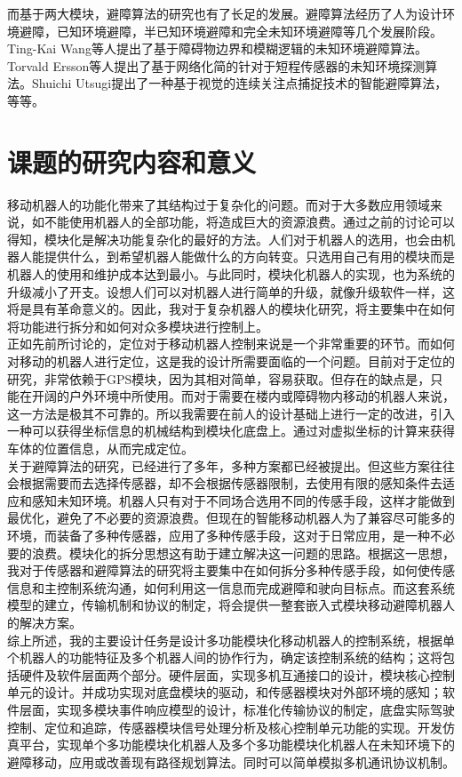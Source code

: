 而基于两大模块，避障算法的研究也有了长足的发展。避障算法经历了人为设计环境避障，已知环境避障，半已知环境避障和完全未知环境避障等几个发展阶段。Ting-Kai Wang等人提出了基于障碍物边界和模糊逻辑的未知环境避障算法。Torvald Ersson等人提出了基于网络化简的针对于短程传感器的未知环境探测算法。Shuichi Utsugi提出了一种基于视觉的连续关注点捕捉技术的智能避障算法，等等。 \\

\section{课题的研究内容和意义}
移动机器人的功能化带来了其结构过于复杂化的问题。而对于大多数应用领域来说，如不能使用机器人的全部功能，将造成巨大的资源浪费。通过之前的讨论可以得知，模块化是解决功能复杂化的最好的方法。人们对于机器人的选用，也会由机器人能提供什么，到希望机器人能做什么的方向转变。只选用自己有用的模块而是机器人的使用和维护成本达到最小。与此同时，模块化机器人的实现，也为系统的升级减小了开支。设想人们可以对机器人进行简单的升级，就像升级软件一样，这将是具有革命意义的。因此，我对于复杂机器人的模块化研究，将主要集中在如何将功能进行拆分和如何对众多模块进行控制上。 \\

正如先前所讨论的，定位对于移动机器人控制来说是一个非常重要的环节。而如何对移动的机器人进行定位，这是我的设计所需要面临的一个问题。目前对于定位的研究，非常依赖于GPS模块，因为其相对简单，容易获取。但存在的缺点是，只能在开阔的户外环境中所使用。而对于需要在楼内或障碍物内移动的机器人来说，这一方法是极其不可靠的。所以我需要在前人的设计基础上进行一定的改进，引入一种可以获得坐标信息的机械结构到模块化底盘上。通过对虚拟坐标的计算来获得车体的位置信息，从而完成定位。 \\

关于避障算法的研究，已经进行了多年，多种方案都已经被提出。但这些方案往往会根据需要而去选择传感器，却不会根据传感器限制，去使用有限的感知条件去适应和感知未知环境。机器人只有对于不同场合选用不同的传感手段，这样才能做到最优化，避免了不必要的资源浪费。但现在的智能移动机器人为了兼容尽可能多的环境，而装备了多种传感器，应用了多种传感手段，这对于日常应用，是一种不必要的浪费。模块化的拆分思想这有助于建立解决这一问题的思路。根据这一思想，我对于传感器和避障算法的研究将主要集中在如何拆分多种传感手段，如何使传感信息和主控制系统沟通，如何利用这一信息而完成避障和驶向目标点。而这套系统模型的建立，传输机制和协议的制定，将会提供一整套嵌入式模块移动避障机器人的解决方案。  \\

综上所述，我的主要设计任务是设计多功能模块化移动机器人的控制系统，根据单个机器人的功能特征及多个机器人间的协作行为，确定该控制系统的结构；这将包括硬件及软件层面两个部分。硬件层面，实现多机互通接口的设计，模块核心控制单元的设计。并成功实现对底盘模块的驱动，和传感器模块对外部环境的感知；软件层面，实现多模块事件响应模型的设计，标准化传输协议的制定，底盘实际驾驶控制、定位和追踪，传感器模块信号处理分析及核心控制单元功能的实现。开发仿真平台，实现单个多功能模块化机器人及多个多功能模块化机器人在未知环境下的避障移动，应用或改善现有路径规划算法。同时可以简单模拟多机通讯协议机制。 \\


